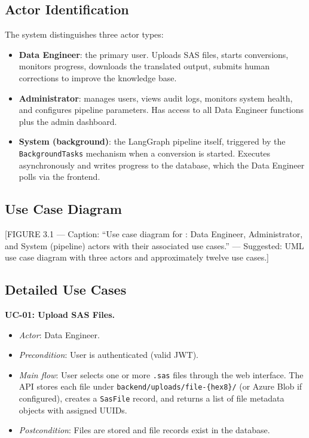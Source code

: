 \subsection{Actor Identification}
\label{subsec:actors}

The system distinguishes three actor types:

\begin{itemize}
  \item \textbf{Data Engineer}: the primary user. Uploads SAS files, starts
    conversions, monitors progress, downloads the translated output, submits
    human corrections to improve the knowledge base.
  \item \textbf{Administrator}: manages users, views audit logs, monitors
    system health, and configures pipeline parameters. Has access to all
    Data Engineer functions plus the admin dashboard.
  \item \textbf{System (background)}: the LangGraph pipeline itself, triggered
    by the \texttt{BackgroundTasks} mechanism when a conversion is started.
    Executes asynchronously and writes progress to the database, which the
    Data Engineer polls via the frontend.
\end{itemize}

\subsection{Use Case Diagram}
\label{subsec:use-case-diagram}

[FIGURE 3.1 --- Caption: ``Use case diagram for \codara{}: Data Engineer,
Administrator, and System (pipeline) actors with their associated use cases.''
--- Suggested: UML use case diagram with three actors and approximately twelve
use cases.]

\subsection{Detailed Use Cases}
\label{subsec:detailed-use-cases}

\textbf{UC-01: Upload SAS Files.}
\begin{itemize}
  \item \textit{Actor}: Data Engineer.
  \item \textit{Precondition}: User is authenticated (valid JWT).
  \item \textit{Main flow}: User selects one or more \texttt{.sas} files
    through the web interface. The API stores each file under
    \texttt{backend/uploads/file-\{hex8\}/} (or Azure Blob if configured),
    creates a \texttt{SasFile} record, and returns a list of file metadata
    objects with assigned UUIDs.
  \item \textit{Postcondition}: Files are stored and file records exist in
    the database.
\end{itemize}

